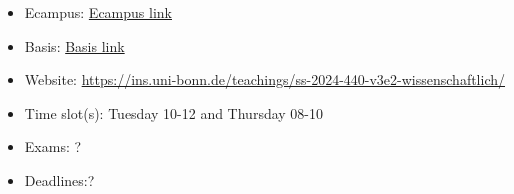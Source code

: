 \begin{tcolorbox}[enhanced,breakable,
	title=General Information,frame style={color=mycolor}]
    \begin{itemize}
        \item Ecampus: \href{https://ecampus.uni-bonn.de/goto.php?target=crs_3306528&client_id=ecampus}{Ecampus link}
        \item Basis: \href{https://basis.uni-bonn.de/qisserver/rds?state=verpublish&status=init&vmfile=no&publishid=239856&moduleCall=webInfo&publishConfFile=webInfo&publishSubDir=veranstaltung}{Basis link}
        \item Website: \href{https://ins.uni-bonn.de/teachings/ss-2024-440-v3e2-wissenschaftlich/}{https://ins.uni-bonn.de/teachings/ss-2024-440-v3e2-wissenschaftlich/}
        \item Time slot(s): Tuesday 10-12 and Thursday 08-10
        \item Exams: ?
        \item Deadlines:?
    \end{itemize}
\end{tcolorbox}